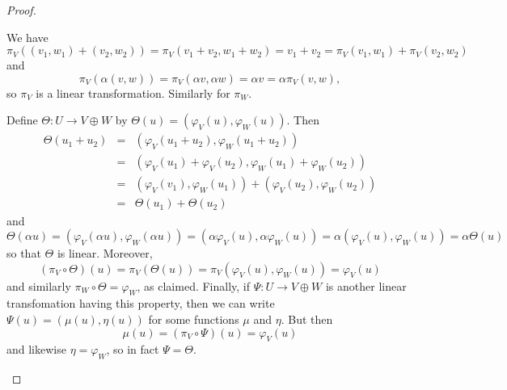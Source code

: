 \documentclass{memoir}
\begin{document}
\begin{proof} \mbox{}
\begin{enumerate*}
\item We have \[ \pi_V((v_1,w_1) + (v_2,w_2)) = \pi_V(v_1+v_2, w_1+w_2) = v_1+v_2 = \pi_V(v_1,w_1) + \pi_V(v_2,w_2) \] and \[ \pi_V(\alpha(v,w)) = \pi_V(\alpha v, \alpha w) = \alpha v = \alpha \pi_V(v,w), \] so $\pi_V$ is a linear transformation. Similarly for $\pi_W$.
\item Define $\Theta : U \rightarrow V \oplus W$ by $\Theta(u) = (\varphi_V(u), \varphi_W(u))$. Then \[ \begin{array}{ccc} \Theta(u_1 + u_2) & = & (\varphi_V(u_1+u_2), \varphi_W(u_1+u_2)) \\ & = & (\varphi_V(u_1) + \varphi_V(u_2), \varphi_W(u_1) + \varphi_W(u_2)) \\ & = & (\varphi_V(v_1), \varphi_W(u_1)) + (\varphi_V(u_2), \varphi_W(u_2)) \\ & = & \Theta(u_1) + \Theta(u_2) \end{array} \] and \[ \Theta(\alpha u) = (\varphi_V(\alpha u), \varphi_W(\alpha u)) = (\alpha\varphi_V(u), \alpha\varphi_W(u)) = \alpha(\varphi_V(u),\varphi_W(u)) = \alpha\Theta(u) \] so that $\Theta$ is linear. Moreover, \[ (\pi_V \circ \Theta)(u) = \pi_V(\Theta(u)) = \pi_V(\varphi_V(u), \varphi_W(u)) = \varphi_V(u) \] and similarly $\pi_W \circ \Theta = \varphi_W$, as claimed. Finally, if $\Psi : U \rightarrow V \oplus W$ is another linear transfomation having this property, then we can write $\Psi(u) = (\mu(u), \eta(u))$ for some functions $\mu$ and $\eta$. But then \[ \mu(u) = (\pi_V \circ \Psi)(u) = \varphi_V(u) \] and likewise $\eta = \varphi_W$, so in fact $\Psi = \Theta$. \qedhere
\end{enumerate*}
\end{proof}
\end{document}
